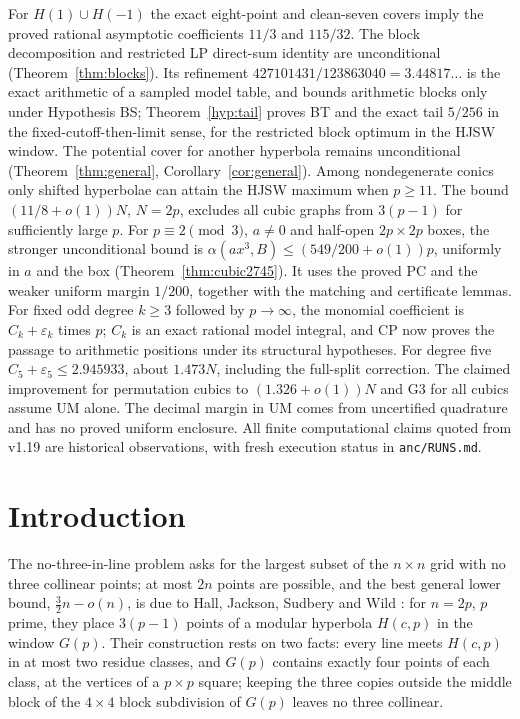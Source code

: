 \documentclass[11pt]{article}
\theoremstyle{remark}
\newcommand{\Hc}{H(c,p)}
\newcommand{\Gp}{G(p)}
\begin{document}
For $H(1)\cup H(-1)$ the exact eight-point and clean-seven covers imply the proved rational asymptotic coefficients $11/3$ and $115/32$.
The block decomposition and restricted LP direct-sum identity are unconditional (Theorem~\ref{thm:blocks}).
Its refinement $427101431/123863040=3.44817\ldots$ is the exact arithmetic of a sampled model table,
and bounds arithmetic blocks only under Hypothesis BS; Theorem~\ref{hyp:tail} proves BT and the exact tail $5/256$
in the fixed-cutoff-then-limit sense, for the restricted block optimum in the HJSW window.
The potential cover for another hyperbola remains unconditional (Theorem~\ref{thm:general}, Corollary~\ref{cor:general}).
Among nondegenerate conics only shifted hyperbolae can attain the HJSW maximum when $p\ge11$.
The bound $(11/8+o(1))N$, $N=2p$, excludes all cubic graphs from $3(p-1)$ for sufficiently large $p$.
For $p\equiv2\pmod3$, $a\ne0$ and half-open $2p\times2p$ boxes, the stronger unconditional bound is
$\alpha(ax^3,B)\le(549/200+o(1))p$, uniformly in $a$ and the box (Theorem~\ref{thm:cubic2745}).
It uses the proved PC and the weaker uniform margin $1/200$, together with the matching and certificate lemmas.
For fixed odd degree $k\ge3$ followed by $p\to\infty$, the monomial coefficient is $C_k+\varepsilon_k$ times $p$;
$C_k$ is an exact rational model integral, and CP now proves the passage to arithmetic positions under its structural hypotheses.
For degree five $C_5+\varepsilon_5\le2.945933$, about $1.473N$, including the full-split correction.
The claimed improvement for permutation cubics to $(1.326+o(1))N$ and G3 for all cubics assume UM alone.
The decimal margin in UM comes from uncertified quadrature and has no proved uniform enclosure.
All finite computational claims quoted from v1.19 are historical observations, with fresh execution status in \texttt{anc/RUNS.md}.

\section{Introduction}

The no-three-in-line problem asks for the largest subset of the $n\times n$ grid with no three collinear points; at most
$2n$ points are possible, and the best general lower bound, $\tfrac32 n-o(n)$, is due to Hall, Jackson, Sudbery and Wild
\cite{HJSW75}: for $n=2p$, $p$ prime, they place $3(p-1)$ points of a modular hyperbola $\Hc$ in the window $\Gp$.  Their
construction rests on two facts: every line meets $\Hc$ in at most two residue classes, and $\Gp$ contains exactly four
points of each class, at the vertices of a $p\times p$ square; keeping the three copies outside the middle block of the
$4\times4$ block subdivision of $\Gp$ leaves no three collinear.
\end{document}
